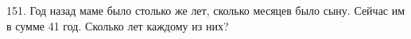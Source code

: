 151. Год назад маме было столько же лет, сколько месяцев было сыну. Сейчас им в сумме 41 год. Сколько лет каждому из них?\\

